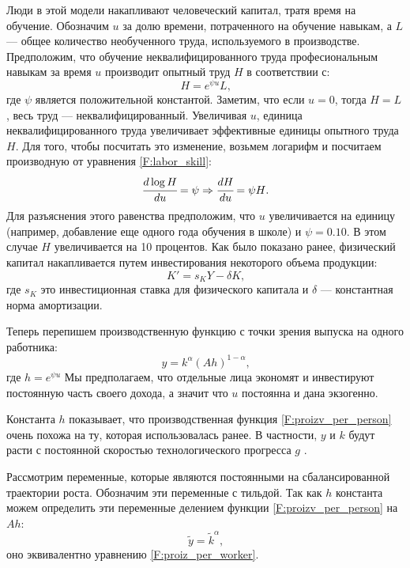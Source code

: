 Люди в этой модели накапливают человеческий капитал, тратя время на обучение.
Обозначим $u$ за долю времени, потраченного на обучение навыкам, а $L$ --- общее количество необученного труда, используемого в производстве.
Предположим, что обучение неквалифицированного труда професиональным навыкам за время $u$ производит опытный труд $H$ в соответствии с:
\begin{equation}
H=e^{\psi u} L \text{,}
\label{F:labor_skill}
\end{equation}
где $\psi$ является положительной константой.
Заметим, что если $u = 0$, тогда $H = L$, весь труд --- неквалифицированный.
Увеличивая $u$, единица неквалифицированного труда увеличивает эффективные единицы опытного труда $H$.
Для того, чтобы посчитать это изменение, возьмем логарифм и посчитаем производную от уравнения \ref{F:labor_skill}:
\begin{equation*}
\cfrac{d \log{H}}{du} = \psi \Rightarrow \cfrac{dH}{du}=\psi H\text{.}
\end{equation*}
Для разъяснения этого равенства предположим, что $u$ увеличивается на единицу (например, добавление еще одного года обучения в школе) и $\psi = 0.10$.
В этом случае $H$ увеличивается на 10 процентов.
Как было показано ранее, физический капитал накапливается путем инвестирования некоторого объема продукции:
\begin{equation*}
K'=s_{K}Y - \delta K \text{,}
\end{equation*}
где $s_{K}$ это инвестиционная ставка для физического капитала и $\delta$ --- константная норма амортизации.

Теперь перепишем производственную функцию с точки зрения выпуска на одного работника:
\begin{equation}
y = k^{\alpha}\left(Ah\right)^{1 - \alpha}\text{,}
\label{F:proizv_per_person}
\end{equation}
где $h=e^{\psi u}$
Мы предполагаем, что отдельные лица экономят и инвестируют постоянную часть своего дохода, а значит что $u$ постоянна и дана экзогенно.

Константа $h$ показывает, что производственная функция \ref{F:proizv_per_person} очень похожа на ту, которая использовалась ранее.
В частности, $y$ и $k$ будут расти с постоянной скоростью технологического прогресса $g$ .

Рассмотрим переменные, которые являются постоянными на сбалансированной траектории роста.
Обозначим эти переменные с тильдой.
Так как $h$ константа можем определить эти переменные делением функции \ref{F:proizv_per_person} на $Ah$:
\begin{equation}
\tilde{y} = \tilde{k}^{\alpha}\text{,}
\end{equation}
оно эквивалентно уравнению \ref{F:proiz_per_worker}.


